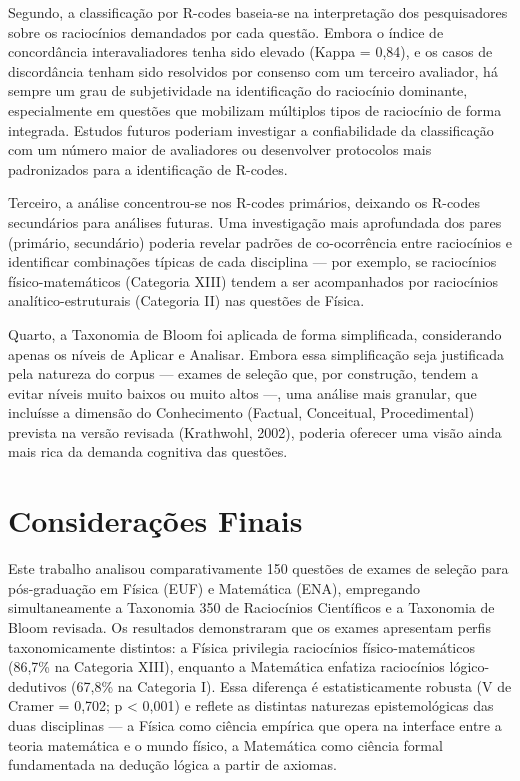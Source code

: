 \documentclass[
  12pt,
  a4paper,
  twoside,
  brazilian
]{article}
\begin{document}
Segundo, a classificação por R-codes baseia-se na interpretação dos
pesquisadores sobre os raciocínios demandados por cada questão. Embora o
índice de concordância interavaliadores tenha sido elevado (Kappa =
0,84), e os casos de discordância tenham sido resolvidos por consenso
com um terceiro avaliador, há sempre um grau de subjetividade na
identificação do raciocínio dominante, especialmente em questões que
mobilizam múltiplos tipos de raciocínio de forma integrada. Estudos
futuros poderiam investigar a confiabilidade da classificação com um
número maior de avaliadores ou desenvolver protocolos mais padronizados
para a identificação de R-codes.

Terceiro, a análise concentrou-se nos R-codes primários, deixando os
R-codes secundários para análises futuras. Uma investigação mais
aprofundada dos pares (primário, secundário) poderia revelar padrões de
co-ocorrência entre raciocínios e identificar combinações típicas de
cada disciplina --- por exemplo, se raciocínios físico-matemáticos
(Categoria XIII) tendem a ser acompanhados por raciocínios
analítico-estruturais (Categoria II) nas questões de Física.

Quarto, a Taxonomia de Bloom foi aplicada de forma simplificada,
considerando apenas os níveis de Aplicar e Analisar. Embora essa
simplificação seja justificada pela natureza do corpus --- exames de
seleção que, por construção, tendem a evitar níveis muito baixos ou
muito altos ---, uma análise mais granular, que incluísse a dimensão do
Conhecimento (Factual, Conceitual, Procedimental) prevista na versão
revisada (Krathwohl, 2002), poderia oferecer uma visão ainda mais rica
da demanda cognitiva das questões.

\newpage
\section{Considerações Finais}\label{considerauxe7uxf5es-finais}

Este trabalho analisou comparativamente 150 questões de exames de
seleção para pós-graduação em Física (EUF) e Matemática (ENA),
empregando simultaneamente a Taxonomia 350 de Raciocínios Científicos e
a Taxonomia de Bloom revisada. Os resultados demonstraram que os exames
apresentam perfis taxonomicamente distintos: a Física privilegia
raciocínios físico-matemáticos (86,7\% na Categoria XIII), enquanto a
Matemática enfatiza raciocínios lógico-dedutivos (67,8\% na Categoria
I). Essa diferença é estatisticamente robusta (V de Cramer = 0,702; p
\textless{} 0,001) e reflete as distintas naturezas epistemológicas das
duas disciplinas --- a Física como ciência empírica que opera na
interface entre a teoria matemática e o mundo físico, a Matemática como
ciência formal fundamentada na dedução lógica a partir de axiomas.
\end{document}
